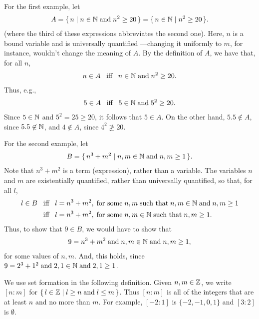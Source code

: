 For the first example, let
\begin{gather*}
A=\{ \, n \mid n\in\mathbb{N}\;\allowbreak\mbox{and}\allowbreak\;n^2\geq 20 \, \}
 =\{ \, n\in\mathbb{N} \mid n^2\geq 20 \, \}.
\end{gather*}
(where the third of these expressions abbreviates the second one).
Here, $n$ is a bound variable
%
and is universally quantified%
%
%
---changing it uniformly to $m$, for instance, wouldn't change the
meaning of $A$.  By the definition of $A$, we have that, for all $n$,
\begin{gather*}
n\in A\mathrel{\;\;\allowbreak\mbox{iff}\allowbreak\;\;} n\in\mathbb{N}\;\allowbreak\mbox{and}\allowbreak\;n^2\geq 20.
\end{gather*}
Thus, e.g.,
\begin{gather*}
5\in A\mathrel{\;\;\allowbreak\mbox{iff}\allowbreak\;\;} 5\in\mathbb{N}\;\allowbreak\mbox{and}\allowbreak\;5^2\geq 20 .
\end{gather*}
Since $5\in\mathbb{N}$ and $5^2=25\geq 20$, it follows that $5\in A$.  On
the other hand, $5.5\not\in A$, since $5.5\not\in\mathbb{N}$, and $4\not\in A$,
since $4^2\not\geq 20$.

For the second example, let
\begin{gather*}
B=\{ \, n^3+m^2 \mid n,m\in\mathbb{N}\;\allowbreak\mbox{and}\allowbreak\;n,m\geq 1 \, \} .
\end{gather*}
Note that $n^3+m^2$ is a term (expression), rather than a variable.
The variables $n$ and $m$ are existentially quantified,
%
%
rather than universally quantified, so that, for all $l$,
\begin{align*}
l\in B&\mathrel{\;\;\allowbreak\mbox{iff}\allowbreak\;\;} l = n^3 + m^2, \;\allowbreak\mbox{for some}\allowbreak\;
         n, m\;\allowbreak\mbox{such that}\allowbreak\;n,m\in\mathbb{N}\;\allowbreak\mbox{and}\allowbreak\;n,m\geq 1 \\
      &\mathrel{\;\;\allowbreak\mbox{iff}\allowbreak\;\;} l = n^3 + m^2, \;\allowbreak\mbox{for some}\allowbreak\;
         n, m\in\mathbb{N}\;\allowbreak\mbox{such that}\allowbreak\;n,m\geq 1.
\end{align*}
Thus, to show that $9\in B$, we would have to show that
\begin{gather*}
9 = n^3 + m^2\;\allowbreak\mbox{and}\allowbreak\;n,m\in\mathbb{N}\;\allowbreak\mbox{and}\allowbreak\;n,m\geq 1 ,
\end{gather*}
for some values of $n,m$.  And, this holds, since $9 = 2^3 +
1^2\;\allowbreak\mbox{and}\allowbreak\;2,1\in\mathbb{N}\;\allowbreak\mbox{and}\allowbreak\;2,1\geq 1$.

We use set formation in the following definition.
Given $n,m\in\mathbb{Z}$, we write $[n:m]$ for $\{ \, l\in\mathbb{Z} \mid l\geq
  n\;\allowbreak\mbox{and}\allowbreak\;l\leq m \, \}$.
%
%
%
%
%
Thus $[n:m]$ is all of the integers that are at least $n$ and no
more than $m$.  For example, $[-2:1]$ is $\{-2,-1,0,1\}$ and
$[3:2]$ is $\emptyset$.

